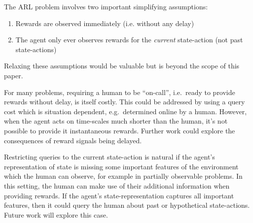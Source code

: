 \documentclass{article}
\begin{document}
The ARL problem involves two important simplifying assumptions: 
\begin{enumerate}
\item Rewards are observed immediately (i.e. without any delay)
\item The agent only ever observes rewards for the {\em current} state-action (not past state-actions)
\end{enumerate}
Relaxing these assumptions would be valuable but is beyond the scope of this paper. %

For many problems, requiring a human to be ``on-call'', i.e.\ ready to provide rewards without delay, is itself costly.
This could be addressed by using a query cost which is situation dependent, e.g.\ determined online by a human.
However, when the agent acts on time-scales much shorter than the human, it's not possible to provide it instantaneous rewards. 
Further work could explore the consequences of reward signals being delayed.

Restricting queries to the current state-action is natural
if the agent's representation of state is missing some important features of the environment which the human can observe,
for example in partially observable problems.
In this setting, the human can make use of their additional information when providing rewards.
If the agent's state-representation captures all important features, then it could query the human about past or hypothetical state-actions. Future work will explore this case.
\end{document}
